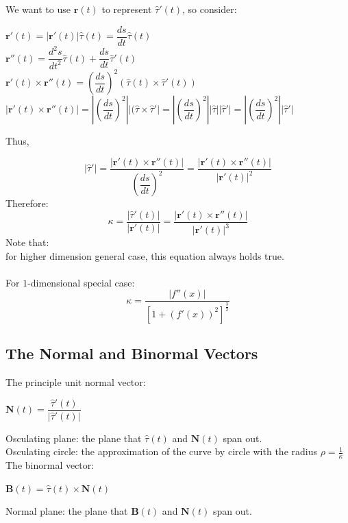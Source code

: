 \documentclass[UTF8,a4paper, 10pt, openany]{book}
\begin{document}
We want to use $\mathbf{r}(t)$ to represent $\hat{\tau}'(t)$, so consider:

\begin{center}
$\mathbf{r}'(t)=|\mathbf{r}'(t)|\hat{\tau}(t)=\dfrac{ds}{dt}\hat{\tau}(t)$\\
$\mathbf{r}''(t)=\dfrac{d^2s}{dt^2}\hat{\tau}(t)+\dfrac{ds}{dt}\hat{\tau}'(t)$\\
$\mathbf{r}'(t)\times \mathbf{r}''(t)=(\dfrac{ds}{dt})^2(\hat{\tau}(t)\times \hat{\tau}'(t))$\\
$|\mathbf{r}'(t)\times \mathbf{r}''(t)|=|(\dfrac{ds}{dt})^2||(\hat{\tau}\times \hat{\tau}'|=|(\dfrac{ds}{dt})^2||\hat{\tau}||\hat{\tau}'|=|(\dfrac{ds}{dt})^2||\hat{\tau}'|$
\end{center}

Thus,

\begin{equation}
\boxed{|\hat{\tau}'|=\dfrac{|\mathbf{r}'(t)\times \mathbf{r}''(t)|}{(\dfrac{ds}{dt})^2}=\dfrac{|\mathbf{r}'(t)\times \mathbf{r}''(t)|}{|\mathbf{r}'(t)|^2}}
\end{equation}
Therefore:
\begin{equation}
\boxed{\kappa=\dfrac{|\hat{\tau}'(t)|}{|\mathbf{r}'(t)|}=\dfrac{|\mathbf{r}'(t)\times \mathbf{r}''(t)|}{|\mathbf{r}'(t)|^3}}
\end{equation}
Note that:\\
for higher dimension general case, this equation always holds true.\\ \\
For $1$-dimensional special case:
\begin{equation}
\boxed{\kappa=\dfrac{|f''(x)|}{[1+(f'(x))^2]^{\frac{3}{2}}}}
\end{equation}
\subsection{The Normal and Binormal Vectors}
The principle unit normal vector:
\begin{center}
$\mathbf{N}(t)=\dfrac{\hat{\tau}'(t)}{|\hat{\tau}'(t)|}$
\end{center}
Osculating plane: the plane that $\hat{\tau}(t)$ and $\mathbf{N}(t)$ span out.\\
Osculating circle: the approximation of the curve by circle with the radius $\rho = \frac{1}{\kappa}$\\
The binormal vector:
\begin{center}
$\mathbf{B}(t)=\hat{\tau}(t)\times \mathbf{N}(t)$
\end{center}
Normal plane: the plane that $\mathbf{B}(t)$ and $\mathbf{N}(t)$ span out.
\end{document}

